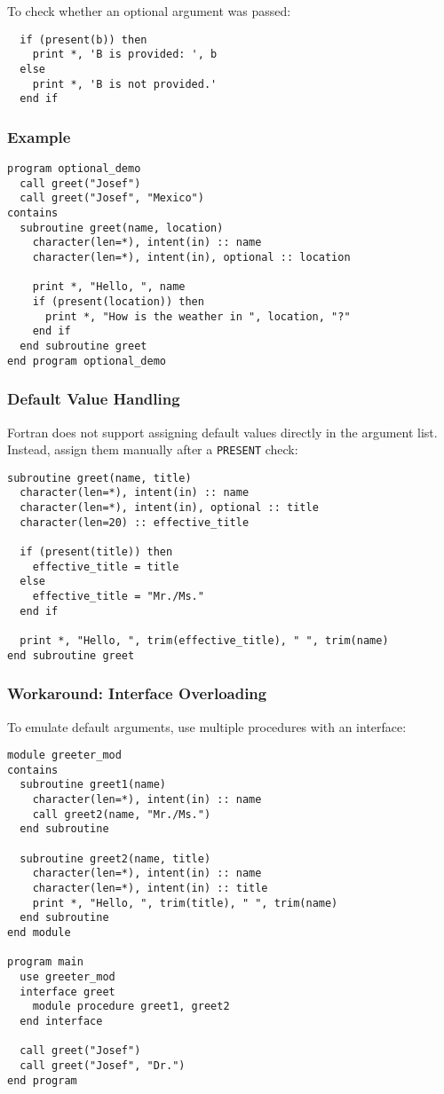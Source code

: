 \documentclass{article}
\begin{document}
To check whether an optional argument was passed:

\begin{verbatim}
  if (present(b)) then
    print *, 'B is provided: ', b
  else
    print *, 'B is not provided.'
  end if
\end{verbatim}

\subsubsection{Example}

\begin{verbatim}
program optional_demo
  call greet("Josef")
  call greet("Josef", "Mexico")
contains
  subroutine greet(name, location)
    character(len=*), intent(in) :: name
    character(len=*), intent(in), optional :: location

    print *, "Hello, ", name
    if (present(location)) then
      print *, "How is the weather in ", location, "?"
    end if
  end subroutine greet
end program optional_demo
\end{verbatim}

\subsubsection{Default Value Handling}

Fortran does not support assigning default values directly in the argument list. Instead, assign them manually after a \texttt{PRESENT} check:

\begin{verbatim}
subroutine greet(name, title)
  character(len=*), intent(in) :: name
  character(len=*), intent(in), optional :: title
  character(len=20) :: effective_title

  if (present(title)) then
    effective_title = title
  else
    effective_title = "Mr./Ms."
  end if

  print *, "Hello, ", trim(effective_title), " ", trim(name)
end subroutine greet
\end{verbatim}

\subsubsection{Workaround: Interface Overloading}

To emulate default arguments, use multiple procedures with an interface:

\begin{verbatim}
module greeter_mod
contains
  subroutine greet1(name)
    character(len=*), intent(in) :: name
    call greet2(name, "Mr./Ms.")
  end subroutine

  subroutine greet2(name, title)
    character(len=*), intent(in) :: name
    character(len=*), intent(in) :: title
    print *, "Hello, ", trim(title), " ", trim(name)
  end subroutine
end module

program main
  use greeter_mod
  interface greet
    module procedure greet1, greet2
  end interface

  call greet("Josef")
  call greet("Josef", "Dr.")
end program
\end{verbatim}
\end{document}
